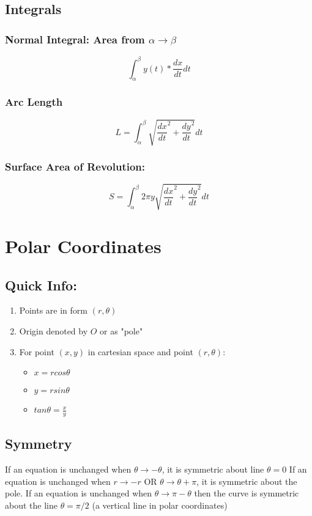 \documentclass[a4paper,12pt]{report}
\begin{document}
\subsection{Integrals}
\subsubsection{Normal Integral: Area from $\alpha \to \beta$}
$$\int_{\alpha}^{\beta}y(t)*\frac{dx}{dt}dt$$
\subsubsection{Arc Length}
$$L = \int_{\alpha}^{\beta} \sqrt{ \frac{dx}{dt}^2 + \frac{dy}{dt}^2 }dt$$
\subsubsection{Surface Area of Revolution: }
$$S = \int_{\alpha}^{\beta} 2\pi y \sqrt{\frac{dx}{dt}^2 + \frac{dy}{dt}^2}dt$$



\section{Polar Coordinates}
\subsection{Quick Info: }
\begin{enumerate}
\item Points are in form $(r, \theta)$
\item Origin denoted by $O$ or as "pole"
\item For point $(x, y)$ in cartesian space and point $(r, \theta)$:
\begin{itemize}
\item $x = r cos \theta$
\item $y = r sin \theta$
\item $tan \theta = \frac{x}{y}$
\end{itemize}
\end{enumerate}

\subsection{Symmetry}
If an equation is unchanged when $\theta \to -\theta$, it is symmetric about line $\theta = 0$
If an equation is unchanged when $r \to -r$ OR $\theta \to \theta + \pi$, it is symmetric about the pole.
If an equation is unchanged when $\theta \to \pi - \theta$ then the curve is symmetric about the line $\theta = \pi/2$ (a vertical line in polar coordinates)
\end{document}
